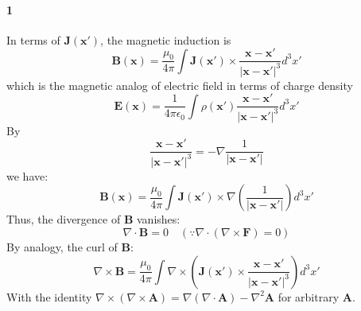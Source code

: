 \documentclass{article}
\begin{document}
	\paragraph{1}
	In terms of $\mathbf{J}(\mathbf{x'})$, the magnetic induction is
	\begin{equation*}
		\mathbf{B}(\mathbf{x}) = \frac{\mu_0}{4\pi} \int \mathbf{J}(\mathbf{x'}) \times \frac{\mathbf{x}-\mathbf{x'}}{|\mathbf{x}-\mathbf{x'}|^3} d^3x'
	\end{equation*}
	which is the magnetic analog of electric field in terms of charge density
	\begin{equation*}
		\mathbf{E}(\mathbf{x}) = \frac{1}{4\pi\epsilon_0} \int \rho(\mathbf{x'}) \frac{\mathbf{x}-\mathbf{x'}}{|\mathbf{x}-\mathbf{x'}|^3} d^3x'
	\end{equation*}
	By
	\begin{equation*}
		\frac{\mathbf{x}-\mathbf{x'}}{|\mathbf{x}-\mathbf{x'}|^3} = -\nabla \frac{1}{|\mathbf{x}-\mathbf{x'}|}
	\end{equation*}
	we have:
	\begin{equation*}
		\mathbf{B}(\mathbf{x}) = \frac{\mu_0}{4\pi} \int \mathbf{J}(\mathbf{x'}) \times \nabla \left(\frac{1}{|\mathbf{x}-\mathbf{x'}|}\right) d^3x'
	\end{equation*}
	Thus, the divergence of $\mathbf{B}$ vanishes:
	\begin{equation*}
		\nabla \cdot \mathbf{B} = 0 \quad (\because \nabla \cdot (\nabla \times \mathbf{F}) = 0)
	\end{equation*}
	By analogy, the curl of $\mathbf{B}$:
	\begin{equation*}
		\nabla \times \mathbf{B} = \frac{\mu_0}{4\pi} \int \nabla \times \left( \mathbf{J}(\mathbf{x'}) \times \frac{\mathbf{x}-\mathbf{x'}}{|\mathbf{x}-\mathbf{x'}|^3} \right) d^3x'
	\end{equation*}
	With the identity $\nabla \times (\nabla \times \mathbf{A}) = \nabla(\nabla \cdot \mathbf{A}) - \nabla^2 \mathbf{A}$ for arbitrary $\mathbf{A}$.
	
\end{document}
